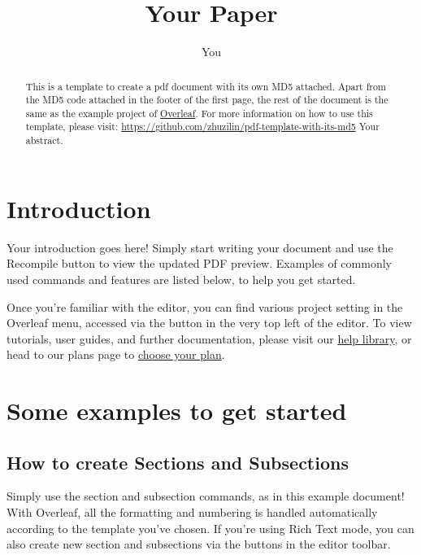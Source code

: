\documentclass{article}
\title{Your Paper}
\author{You}
\begin{document}
\maketitle
\thispagestyle{firstpage}

\begin{abstract}
This is a template to create a pdf document with its own MD5 attached. Apart from the MD5 code attached in the footer of the first page, the rest of the document is the same as the example project of \href{https://www.overleaf.com/project}{Overleaf}. For more information on how to use this template, please visit:
\href{https://github.com/zhuzilin/pdf-template-with-its-md5}{https://github.com/zhuzilin/pdf-template-with-its-md5}
\bigbreak
Your abstract.
\end{abstract}

\section{Introduction}

Your introduction goes here! Simply start writing your document and use the Recompile button to view the updated PDF preview. Examples of commonly used commands and features are listed below, to help you get started.

Once you're familiar with the editor, you can find various project setting in the Overleaf menu, accessed via the button in the very top left of the editor. To view tutorials, user guides, and further documentation, please visit our \href{https://www.overleaf.com/learn}{help library}, or head to our plans page to \href{https://www.overleaf.com/user/subscription/plans}{choose your plan}.

\section{Some examples to get started}

\subsection{How to create Sections and Subsections}

Simply use the section and subsection commands, as in this example document! With Overleaf, all the formatting and numbering is handled automatically according to the template you've chosen. If you're using Rich Text mode, you can also create new section and subsections via the buttons in the editor toolbar.
\end{document}
